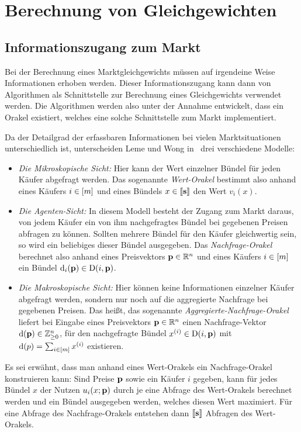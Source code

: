 \section{Berechnung von Gleichgewichten}


\subsection{Informationszugang zum Markt}

Bei der Berechnung eines Marktgleichgewichts müssen auf irgendeine Weise Informationen erhoben werden.
Dieser Informationszugang kann dann von Algorithmen als Schnittstelle zur Berechnung eines Gleichgewichts verwendet werden.
Die Algorithmen werden also unter der Annahme entwickelt, dass ein Orakel existiert, welches eine solche Schnittstelle zum Markt implementiert.

Da der Detailgrad der erfassbaren Informationen bei vielen Marktsituationen unterschiedlich ist, unterscheiden Leme und Wong in~\cite{PaesLeme2018} drei verschiedene Modelle:
\begin{itemize}
	\item \emph{Die Mikroskopische Sicht:} Hier kann der Wert einzelner Bündel für jeden Käufer abgefragt werden.
	Das sogenannte \emph{Wert-Orakel} bestimmt also anhand eines Käufers $i\in\left[ m \right]$ und eines Bündels $x\in\left\llbracket \mathbf{s} \right\rrbracket$ den Wert $v_i(x)$.
	\item \emph{Die Agenten-Sicht:} In diesem Modell besteht der Zugang zum Markt daraus, von jedem Käufer ein von ihm nachgefragtes Bündel bei gegebenen Preisen abfragen zu können.
	Sollten mehrere Bündel für den Käufer gleichwertig sein, so wird ein beliebiges dieser Bündel ausgegeben.
	Das \emph{Nachfrage-Orakel} berechnet also anhand eines Preisvektors $\mathbf{p}\in\mathbb{R}^n$ und eines Käufers $i\in\left[ m \right]$ ein Bündel $\operatorname{d}_i(\mathbf{p})\in\operatorname{D}(i, \mathbf{p})$.
	\item \emph{Die Makroskopische Sicht:} Hier können keine Informationen einzelner Käufer abgefragt werden, sondern nur noch auf die aggregierte Nachfrage bei gegebenen Preisen.
	Das heißt, das sogenannte \emph{Aggregierte-Nachfrage-Orakel} liefert bei Eingabe eines Preisvektors $\mathbf{p}\in\mathbb{R}^n$ einen Nachfrage-Vektor $\operatorname{d}(\mathbf{p})\in\mathbb{Z}_{\geq0}^n$, für den nachgefragte Bündel $x^{(i)} \in \operatorname{D}(i,\mathbf{p})$ mit $\operatorname{d}(p)=\sum_{i\in\left[ m \right]} x^{(i)}$ existieren.
\end{itemize}

Es sei erwähnt, dass man anhand eines Wert-Orakels ein Nachfrage-Orakel konstruieren kann:
Sind Preise $\mathbf{p}$ sowie ein Käufer $i$ gegeben, kann für jedes Bündel $x$ der Nutzen $u_i(x; \mathbf{p})$ durch je eine Abfrage des Wert-Orakels berechnet werden und ein Bündel ausgegeben werden, welches diesen Wert maximiert.
Für eine Abfrage des Nachfrage-Orakels entstehen dann $\left\llbracket \mathbf{s} \right\rrbracket$ Abfragen des Wert-Orakels.

